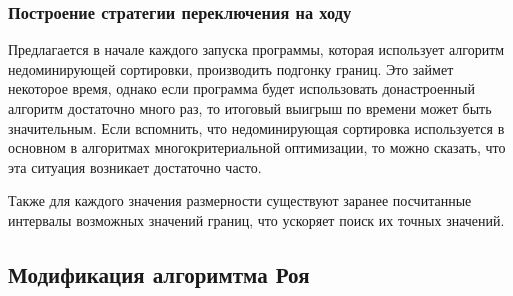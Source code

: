 \subsubsection{Построение стратегии переключения на ходу}

Предлагается в начале каждого запуска программы, которая использует алгоритм недоминирующей сортировки, производить
подгонку границ. Это займет некоторое время, однако если программа будет использовать донастроенный алгоритм
достаточно много раз, то итоговый выигрыш по времени может быть значительным. Если вспомнить, что недоминирующая
сортировка используется в основном в алгоритмах многокритериальной оптимизации, то можно сказать, что эта ситуация
возникает достаточно часто.

Также для каждого значения размерности существуют заранее посчитанные интервалы возможных значений границ, что
ускоряет поиск их точных значений.

\subsection{Модификация алгоримтма Роя}

